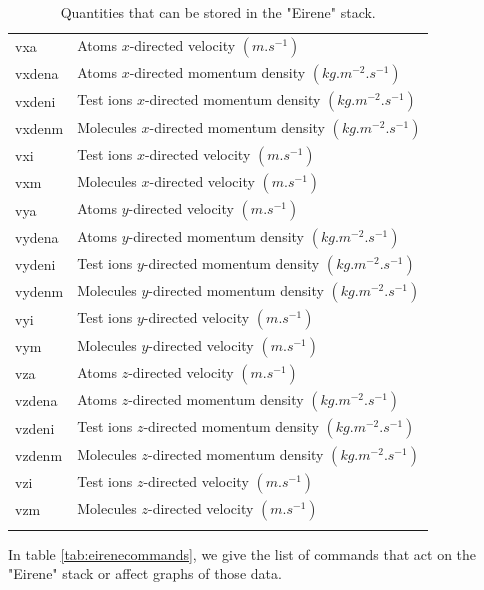 \documentclass[a4paper,10pt]{report}
\begin{document}
\begin{center}
\begin{longtable}{|l|l|}
    vxa \index{b2plot, vxa} & Atoms $x$-directed velocity $(m.s^{-1})$ \\
    vxdena \index{b2plot, vxdena} & Atoms $x$-directed momentum density $(kg.m^{-2}.s^{-1})$ \\
    vxdeni \index{b2plot, vxdeni} & Test ions $x$-directed momentum density $(kg.m^{-2}.s^{-1})$ \\
    vxdenm \index{b2plot, vxdenm} & Molecules $x$-directed momentum density $(kg.m^{-2}.s^{-1})$ \\
    vxi \index{b2plot, vxi} & Test ions $x$-directed velocity $(m.s^{-1})$ \\
    vxm \index{b2plot, vxm} & Molecules $x$-directed velocity $(m.s^{-1})$ \\
    vya \index{b2plot, vya} & Atoms $y$-directed velocity $(m.s^{-1})$ \\
    vydena \index{b2plot, vydena} & Atoms $y$-directed momentum density $(kg.m^{-2}.s^{-1})$ \\
    vydeni \index{b2plot, vydeni} & Test ions $y$-directed momentum density $(kg.m^{-2}.s^{-1})$ \\
    vydenm \index{b2plot, vydenm} & Molecules $y$-directed momentum density $(kg.m^{-2}.s^{-1})$ \\
    vyi \index{b2plot, vyi} & Test ions $y$-directed velocity $(m.s^{-1})$ \\
    vym \index{b2plot, vym} & Molecules $y$-directed velocity $(m.s^{-1})$ \\
    vza \index{b2plot, vza} & Atoms $z$-directed velocity $(m.s^{-1})$ \\
    vzdena \index{b2plot, vzdena} & Atoms $z$-directed momentum density $(kg.m^{-2}.s^{-1})$ \\
    vzdeni \index{b2plot, vzdeni} & Test ions $z$-directed momentum density $(kg.m^{-2}.s^{-1})$ \\
    vzdenm \index{b2plot, vzdenm} & Molecules $z$-directed momentum density $(kg.m^{-2}.s^{-1})$ \\
    vzi \index{b2plot, vzi} & Test ions $z$-directed velocity $(m.s^{-1})$ \\
    vzm \index{b2plot, vzm} & Molecules $z$-directed velocity $(m.s^{-1})$ \\
    \hline
    \caption{Quantities that can be stored in the "Eirene" stack.}
    \label{tab:eirenequantities}
  \end{longtable}
\end{center}

In table \ref{tab:eirenecommands}, we give the list of commands that
act on the "Eirene" stack or affect graphs of those data.
\end{document}

